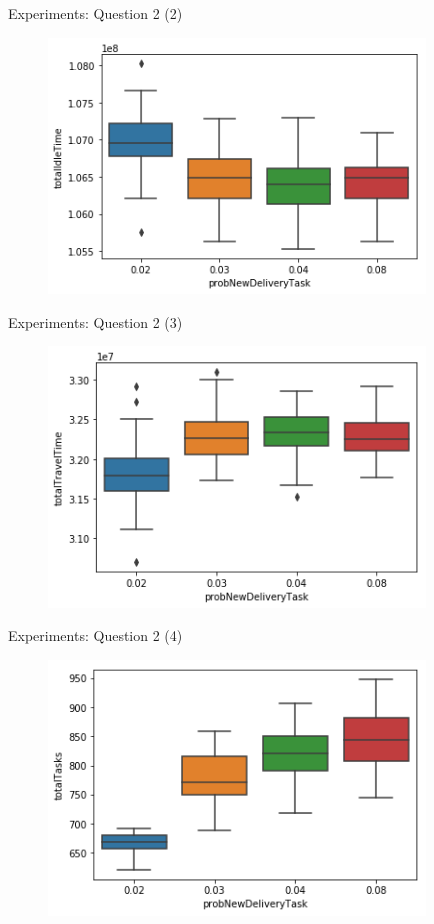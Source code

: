 \begin{frame}{Experiments: Question 2 (2)}
    \begin{figure}[hbt]
  \includegraphics[width=10cm]{imgs/question2-plot1}
  \end{figure}
\end{frame}
\begin{frame}{Experiments: Question 2 (3)}
    \begin{figure}[hbt]
  \includegraphics[width=10cm]{imgs/question2-plot2}
  \end{figure}
\end{frame}
\begin{frame}{Experiments: Question 2 (4)}
    \begin{figure}[hbt]
  \includegraphics[width=10cm]{imgs/question2-plot3}
  \end{figure}
\end{frame}


